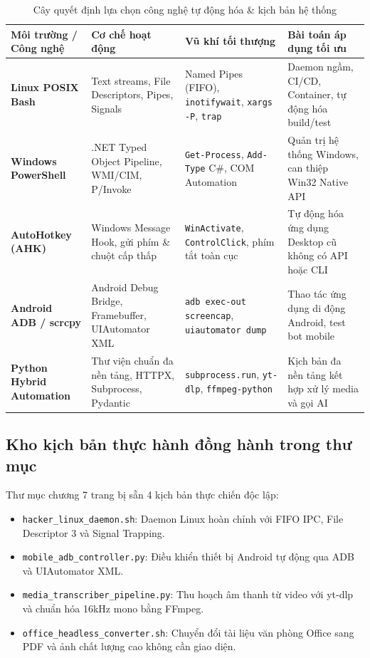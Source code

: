 \documentclass[a4paper,11pt]{article}
\begin{document}
\begin{table}[htbp]
\centering
\small
\caption{Cây quyết định lựa chọn công nghệ tự động hóa \& kịch bản hệ thống}
\vspace{0.5em}
\begin{tabularx}{\textwidth}{L{3.2cm} L{3.8cm} L{4.5cm} Y}
\toprule
\textbf{Môi trường / Công nghệ} & \textbf{Cơ chế hoạt động} & \textbf{Vũ khí tối thượng} & \textbf{Bài toán áp dụng tối ưu} \\
\midrule
\textbf{Linux POSIX Bash} & Text streams, File Descriptors, Pipes, Signals & Named Pipes (FIFO), \texttt{inotifywait}, \texttt{xargs -P}, \texttt{trap} & Daemon ngầm, CI/CD, Container, tự động hóa build/test \\
\textbf{Windows PowerShell} & .NET Typed Object Pipeline, WMI/CIM, P/Invoke & \texttt{Get-Process}, \texttt{Add-Type} C\#, COM Automation & Quản trị hệ thống Windows, can thiệp Win32 Native API \\
\textbf{AutoHotkey (AHK)} & Windows Message Hook, gửi phím \& chuột cấp thấp & \texttt{WinActivate}, \texttt{ControlClick}, phím tắt toàn cục & Tự động hóa ứng dụng Desktop cũ không có API hoặc CLI \\
\textbf{Android ADB / scrcpy} & Android Debug Bridge, Framebuffer, UIAutomator XML & \texttt{adb exec-out screencap}, \texttt{uiautomator dump} & Thao tác ứng dụng di động Android, test bot mobile \\
\textbf{Python Hybrid Automation} & Thư viện chuẩn đa nền tảng, HTTPX, Subprocess, Pydantic & \texttt{subprocess.run}, \texttt{yt-dlp}, \texttt{ffmpeg-python} & Kịch bản đa nền tảng kết hợp xử lý media và gọi AI \\
\bottomrule
\end{tabularx}
\end{table}

\subsection{Kho kịch bản thực hành đồng hành trong thư mục}
Thư mục chương 7 trang bị sẵn 4 kịch bản thực chiến độc lập:
\begin{itemize}[leftmargin=1.5em]
    \item \texttt{hacker\_linux\_daemon.sh}: Daemon Linux hoàn chỉnh với FIFO IPC, File Descriptor 3 và Signal Trapping.
    \item \texttt{mobile\_adb\_controller.py}: Điều khiển thiết bị Android tự động qua ADB và UIAutomator XML.
    \item \texttt{media\_transcriber\_pipeline.py}: Thu hoạch âm thanh từ video với yt-dlp và chuẩn hóa 16kHz mono bằng FFmpeg.
    \item \texttt{office\_headless\_converter.sh}: Chuyển đổi tài liệu văn phòng Office sang PDF và ảnh chất lượng cao không cần giao diện.
\end{itemize}
\end{document}
